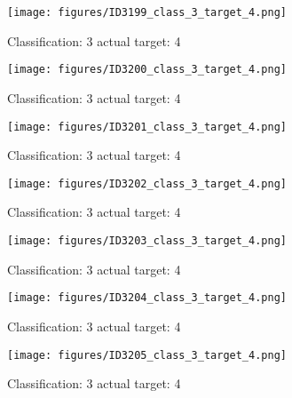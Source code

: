 \begin{figure}[h!]
\begin{center}
\texttt{[image: figures/ID3199\_class\_3\_target\_4.png]}
\end{center}
\caption{ Classification: 3 actual target: 4}
\label{fig:ID3199_class_3_target_4}
\end{figure}
\begin{figure}[h!]
\begin{center}
\texttt{[image: figures/ID3200\_class\_3\_target\_4.png]}
\end{center}
\caption{ Classification: 3 actual target: 4}
\label{fig:ID3200_class_3_target_4}
\end{figure}
\begin{figure}[h!]
\begin{center}
\texttt{[image: figures/ID3201\_class\_3\_target\_4.png]}
\end{center}
\caption{ Classification: 3 actual target: 4}
\label{fig:ID3201_class_3_target_4}
\end{figure}
\begin{figure}[h!]
\begin{center}
\texttt{[image: figures/ID3202\_class\_3\_target\_4.png]}
\end{center}
\caption{ Classification: 3 actual target: 4}
\label{fig:ID3202_class_3_target_4}
\end{figure}
\begin{figure}[h!]
\begin{center}
\texttt{[image: figures/ID3203\_class\_3\_target\_4.png]}
\end{center}
\caption{ Classification: 3 actual target: 4}
\label{fig:ID3203_class_3_target_4}
\end{figure}
\begin{figure}[h!]
\begin{center}
\texttt{[image: figures/ID3204\_class\_3\_target\_4.png]}
\end{center}
\caption{ Classification: 3 actual target: 4}
\label{fig:ID3204_class_3_target_4}
\end{figure}
\begin{figure}[h!]
\begin{center}
\texttt{[image: figures/ID3205\_class\_3\_target\_4.png]}
\end{center}
\caption{ Classification: 3 actual target: 4}
\label{fig:ID3205_class_3_target_4}
\end{figure}
